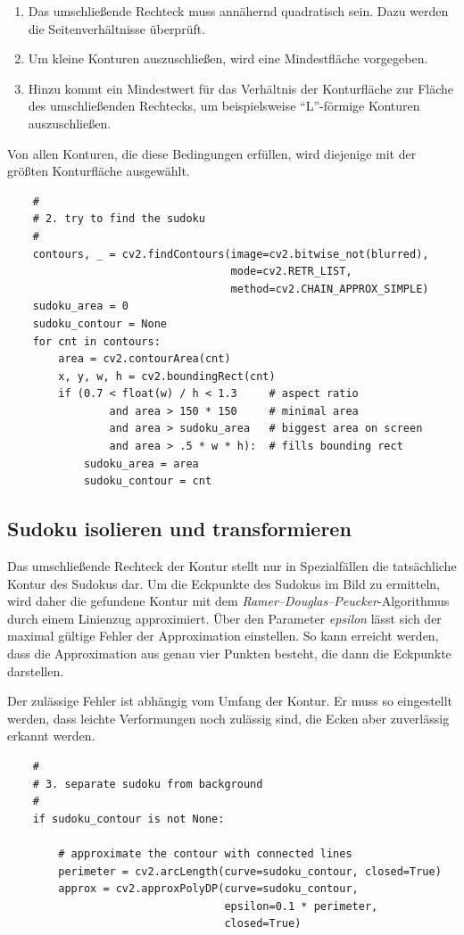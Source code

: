\begin{enumerate}
    \item Das umschließende Rechteck muss annähernd quadratisch sein. Dazu werden die Seitenverhältnisse überprüft.
    \item Um kleine Konturen auszuschließen, wird eine Mindestfläche vorgegeben.
    \item Hinzu kommt ein Mindestwert für das Verhältnis der Konturfläche zur Fläche des umschließenden Rechtecks, um beispielsweise ``L''-förmige Konturen auszuschließen.
\end{enumerate}

Von allen Konturen, die diese Bedingungen erfüllen, wird diejenige mit der größten Konturfläche ausgewählt.

\begin{lstlisting}
    #
    # 2. try to find the sudoku
    #
    contours, _ = cv2.findContours(image=cv2.bitwise_not(blurred),
                                   mode=cv2.RETR_LIST,
                                   method=cv2.CHAIN_APPROX_SIMPLE)
    sudoku_area = 0
    sudoku_contour = None
    for cnt in contours:
        area = cv2.contourArea(cnt)
        x, y, w, h = cv2.boundingRect(cnt)
        if (0.7 < float(w) / h < 1.3     # aspect ratio
                and area > 150 * 150     # minimal area
                and area > sudoku_area   # biggest area on screen
                and area > .5 * w * h):  # fills bounding rect
            sudoku_area = area
            sudoku_contour = cnt
\end{lstlisting}


\subsection{Sudoku isolieren und transformieren}
Das umschließende Rechteck der Kontur stellt nur in Spezialfällen die tatsächliche Kontur des Sudokus dar.
Um die Eckpunkte des Sudokus im Bild zu ermitteln, wird daher die gefundene Kontur mit dem \emph{Ramer–Douglas–Peucker}-Algorithmus durch einem Linienzug approximiert.
Über den Parameter \emph{epsilon} lässt sich der maximal gültige Fehler der Approximation einstellen.
So kann erreicht werden, dass die Approximation aus genau vier Punkten besteht, die dann die Eckpunkte darstellen.

Der zulässige Fehler ist abhängig vom Umfang der Kontur.
Er muss so eingestellt werden, dass leichte Verformungen noch zulässig sind, die Ecken aber zuverlässig erkannt werden.

\begin{lstlisting}
    #
    # 3. separate sudoku from background
    #
    if sudoku_contour is not None:

        # approximate the contour with connected lines
        perimeter = cv2.arcLength(curve=sudoku_contour, closed=True)
        approx = cv2.approxPolyDP(curve=sudoku_contour,
                                  epsilon=0.1 * perimeter,
                                  closed=True)
\end{lstlisting}

